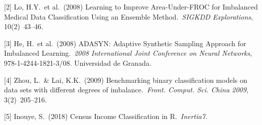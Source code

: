 \documentclass{article}
\begin{document}
[2] Lo, H.Y.\ et al.\ (2008) Learning to Improve Area-Under-FROC for Imbalanced Medical Data Classification Using an Ensemble Method.\ {\it SIGKDD Explorations},
10(2)\ 43--46.

[3] He, H.\ et al.\ (2008) ADASYN: Adaptive Synthetic Sampling Approach for Imbalanced
Learning.\ {\it 2008 International Joint Conference on Neural Networks}, 978-1-4244-1821-3/08. Universidad de Granada.

[4] Zhou, L.\ \& Lai, K.K.\ (2009) Benchmarking binary classification models on data sets with different degrees of imbalance.\ {\it Front. Comput. Sci. China 2009},
3(2)\ 205--216.

[5] Inouye, S.\ (2018) Census Income Classification in R.\ {\it Inertia7}.
\end{document}

